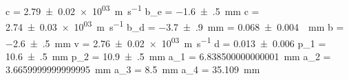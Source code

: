 c = \SI{+2.79(2)e+03}{\meter\per\second}
b_e = \SI{-1.6(5)}{\milli\meter}
c = \SI{+2.74(3)e+03}{\meter\per\second}
b_d = \SI{-3.7(9)}{\milli\meter}
\alpha = \SI{+0.068(4)}{\per\milli\meter}
b = \SI{-2.6(5)}{\milli\meter}
v = \SI{+2.76(2)e+03}{\meter\per\second}
d = \SI{+0.013(6)}{}
p_1 = \SI{+10.6(5)}{\milli\meter}
p_2 = \SI{+10.9(5)}{\milli\meter}
a_1 = \SI[]{6.838500000000001}{\milli\meter}
a_2 = \SI[]{3.6659999999999995}{\milli\meter}
a_3 = \SI[]{8.5}{\milli\meter}
a_4 = \SI[]{35.109}{\milli\meter}
